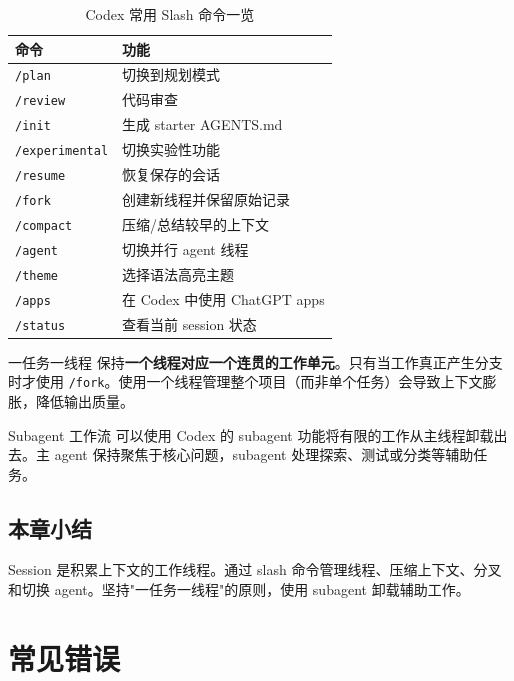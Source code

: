 \documentclass[a4paper]{article}
\begin{document}
\begin{table}[H]
\centering
\begin{tabular}{ll}
\toprule
\textbf{命令} & \textbf{功能} \\
\midrule
\texttt{/plan} & 切换到规划模式 \\
\texttt{/review} & 代码审查 \\
\texttt{/init} & 生成 starter AGENTS.md \\
\texttt{/experimental} & 切换实验性功能 \\
\texttt{/resume} & 恢复保存的会话 \\
\texttt{/fork} & 创建新线程并保留原始记录 \\
\texttt{/compact} & 压缩/总结较早的上下文 \\
\texttt{/agent} & 切换并行 agent 线程 \\
\texttt{/theme} & 选择语法高亮主题 \\
\texttt{/apps} & 在 Codex 中使用 ChatGPT apps \\
\texttt{/status} & 查看当前 session 状态 \\
\bottomrule
\end{tabular}
\caption{Codex 常用 Slash 命令一览}
\end{table}

\begin{importantbox}{一任务一线程}
保持\textbf{一个线程对应一个连贯的工作单元}。只有当工作真正产生分支时才使用 \texttt{/fork}。使用一个线程管理整个项目（而非单个任务）会导致上下文膨胀，降低输出质量。
\end{importantbox}

\begin{knowledgebox}{Subagent 工作流}
可以使用 Codex 的 subagent 功能将有限的工作从主线程卸载出去。主 agent 保持聚焦于核心问题，subagent 处理探索、测试或分类等辅助任务。
\end{knowledgebox}

\subsection{本章小结}

Session 是积累上下文的工作线程。通过 slash 命令管理线程、压缩上下文、分叉和切换 agent。坚持"一任务一线程"的原则，使用 subagent 卸载辅助工作。

\section{常见错误}
\end{document}

